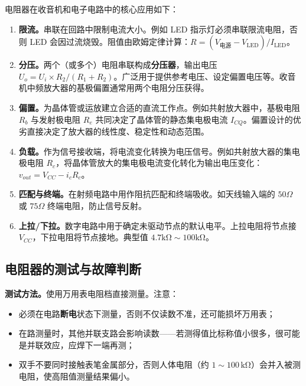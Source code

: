 \documentclass[12pt,UTF8]{ctexbook}
\begin{document}
电阻器在收音机和电子电路中的核心应用如下：

\begin{enumerate}
\item \textbf{限流。}串联在回路中限制电流大小。例如 LED 指示灯必须串联限流电阻，否则 LED 会因过流烧毁。阻值由欧姆定律计算：$R = (V_{\text{电源}} - V_{\text{LED}})/I_{\text{LED}}$。

\item \textbf{分压。}两个（或多个）电阻串联构成\textbf{分压器}，输出电压 $U_o = U_i \times R_2/(R_1+R_2)$。广泛用于提供参考电压、设定偏置电压等。收音机中频放大器的基极偏置通常用两个电阻分压获得。

\item \textbf{偏置。}为晶体管或运放建立合适的直流工作点。例如共射放大器中，基极电阻 $R_b$ 与发射极电阻 $R_e$ 共同决定了晶体管的静态集电极电流 $I_{CQ}$。偏置设计的优劣直接决定了放大器的线性度、稳定性和动态范围。

\item \textbf{负载。}作为信号接收端，将电流变化转换为电压信号。例如共射放大器的集电极电阻 $R_c$，将晶体管放大的集电极电流变化转化为输出电压变化：$v_{out} = V_{CC} - i_c R_c$。

\item \textbf{匹配与终端。}在射频电路中用作阻抗匹配和终端吸收。如天线输入端的 $50\Omega$ 或 $75\Omega$ 终端电阻，防止信号反射。

\item \textbf{上拉/下拉。}数字电路中用于确定未驱动节点的默认电平。上拉电阻将节点接 $V_{CC}$，下拉电阻将节点接地。典型值 $4.7\mathrm{k\Omega}\sim 100\mathrm{k\Omega}$。
\end{enumerate}

\subsection{电阻器的测试与故障判断}

\textbf{测试方法。}使用万用表电阻档直接测量。注意：
\begin{itemize}
  \item 必须在电路\textbf{断电}状态下测量，否则不仅读数不准，还可能损坏万用表；
  \item 在路测量时，其他并联支路会影响读数——若测得值比标称值小很多，很可能是并联效应，应焊下一端再测；
  \item 双手不要同时接触表笔金属部分，否则人体电阻（约 $1\sim 100\,\mathrm{k\Omega}$）会并入被测电阻，使高阻值测量结果偏小。
\end{itemize}
\end{document}
